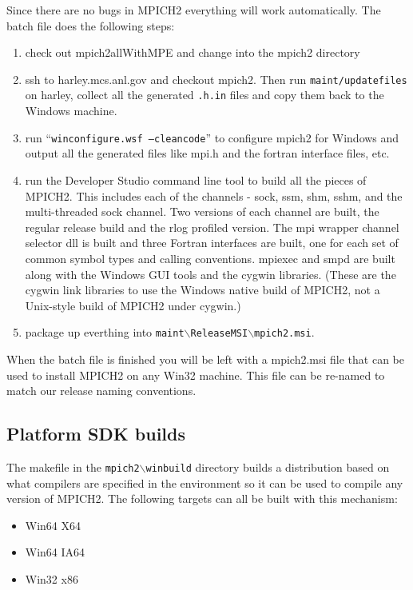 \documentclass[dvipdfm,11pt]{article}
\begin{document}
Since there are no bugs in MPICH2 everything will work automatically.  The batch file does the
following steps:
\begin{enumerate}
\item check out mpich2allWithMPE and change into the mpich2 directory
\item ssh to harley.mcs.anl.gov and checkout mpich2.  Then run \texttt{maint/updatefiles} on
harley, collect all the generated \texttt{.h.in} files and copy them back to the Windows
machine.
\item run ``\texttt{winconfigure.wsf --cleancode}'' to configure mpich2 for Windows and output
all the generated files like mpi.h and the fortran interface files, etc.
\item run the Developer Studio command line tool to build all the pieces of MPICH2.  This
includes each of the channels - sock, ssm, shm, sshm, and the multi-threaded sock
channel.  Two versions of each channel are built, the regular release build and the rlog
profiled version.  The mpi wrapper channel selector dll is built and three Fortran interfaces
are built, one for each set of common symbol types and calling conventions.  mpiexec and
smpd are built along with the Windows GUI tools and the cygwin libraries.  (These are the cygwin
link libraries to use the Windows native build of MPICH2, not a Unix-style build of MPICH2
under cygwin.)
\item package up everthing into \texttt{maint$\backslash$ReleaseMSI$\backslash$mpich2.msi}.
\end{enumerate}

When the batch file is finished you will be left with a mpich2.msi file that can be used to
install MPICH2 on any Win32 machine.  This file can be re-named to match our release naming 
conventions.

\subsection{Platform SDK builds}
\label{sec:psdk_build}

The makefile in the \texttt{mpich2$\backslash$winbuild} directory builds a distribution based 
on what compilers are specified in the environment so it can be used to compile any version of
MPICH2.  The following targets can all be built with this mechanism:
\begin{itemize}
\item Win64 X64
\item Win64 IA64
\item Win32 x86
\end{itemize}
\end{document}
